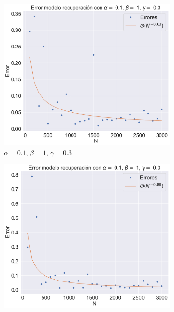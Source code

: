 \begin{figure}[h]
    \centering
    \begin{subfigure}[b]{0.32\textwidth}
        \centering
        \includegraphics[width=\textwidth]{img/content/chapter3/SIR_rec1Errors.pdf}
        \caption{$\alpha=0.1$, $\beta=1$, $\gamma=0.3$}
    \end{subfigure}
    \hfill
    \begin{subfigure}[b]{0.32\textwidth}
        \centering
        \includegraphics[width=\textwidth]{img/content/chapter3/SIR_rec2Errors.pdf}

\end{subfigure}
\end{figure}
